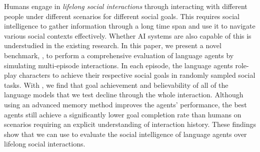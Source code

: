 Humans engage in \emph{lifelong social interactions} through interacting with different people under different scenarios for different social goals. This requires social intelligence to gather information through a long time span and use it to navigate various social contexts effectively. Whether AI systems are also capable of this is understudied in the existing research. In this paper, we present a novel benchmark, \lifelongsotopia, to perform a comprehensive evaluation of language agents by simulating multi-episode interactions. In each episode, the language agents role-play characters to achieve their respective social goals in randomly sampled social tasks. With \lifelongsotopia, we find that goal achievement and believability of all of the language models that we test decline through the whole interaction. Although using an advanced memory method improves the agents' performance, the best agents still achieve a significantly lower goal completion rate than humans on scenarios requiring an explicit understanding of interaction history. These findings show that we can use \lifelongsotopia to evaluate the social intelligence of language agents over lifelong social interactions. 
